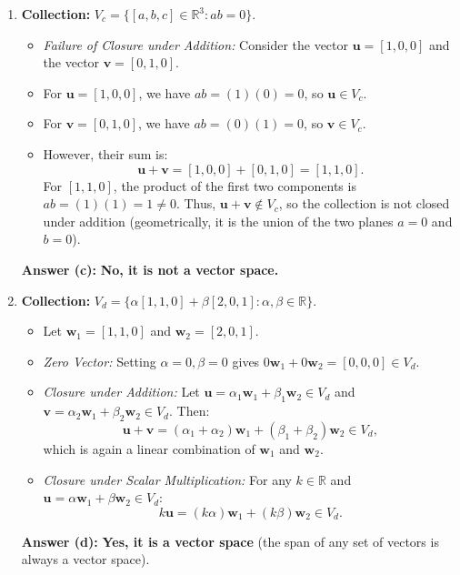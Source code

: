 \documentclass[11pt,a4paper]{article}
\begin{document}
\begin{enumerate}[label=(\alph*)]
    \item \textbf{Collection:} $V_c = \{[a, b, c] \in \mathbb{R}^3 : ab = 0\}$.
    \begin{itemize}
        \item \emph{Failure of Closure under Addition:} Consider the vector $\mathbf{u} = [1, 0, 0]$ and the vector $\mathbf{v} = [0, 1, 0]$.
        \item For $\mathbf{u} = [1, 0, 0]$, we have $a b = (1)(0) = 0$, so $\mathbf{u} \in V_c$.
        \item For $\mathbf{v} = [0, 1, 0]$, we have $a b = (0)(1) = 0$, so $\mathbf{v} \in V_c$.
        \item However, their sum is:
        \[
            \mathbf{u} + \mathbf{v} = [1, 0, 0] + [0, 1, 0] = [1, 1, 0].
        \]
        For $[1, 1, 0]$, the product of the first two components is $a b = (1)(1) = 1 \neq 0$. Thus, $\mathbf{u} + \mathbf{v} \notin V_c$, so the collection is not closed under addition (geometrically, it is the union of the two planes $a = 0$ and $b = 0$).
    \end{itemize}
    \textbf{Answer (c):} \textbf{No, it is not a vector space.}

    \item \textbf{Collection:} $V_d = \{\alpha[1, 1, 0] + \beta[2, 0, 1] : \alpha, \beta \in \mathbb{R}\}$.
    \begin{itemize}
        \item Let $\mathbf{w}_1 = [1, 1, 0]$ and $\mathbf{w}_2 = [2, 0, 1]$.
        \item \emph{Zero Vector:} Setting $\alpha = 0, \beta = 0$ gives $0\mathbf{w}_1 + 0\mathbf{w}_2 = [0, 0, 0] \in V_d$.
        \item \emph{Closure under Addition:} Let $\mathbf{u} = \alpha_1 \mathbf{w}_1 + \beta_1 \mathbf{w}_2 \in V_d$ and $\mathbf{v} = \alpha_2 \mathbf{w}_1 + \beta_2 \mathbf{w}_2 \in V_d$. Then:
        \[
            \mathbf{u} + \mathbf{v} = (\alpha_1 + \alpha_2)\mathbf{w}_1 + (\beta_1 + \beta_2)\mathbf{w}_2 \in V_d,
        \]
        which is again a linear combination of $\mathbf{w}_1$ and $\mathbf{w}_2$.
        \item \emph{Closure under Scalar Multiplication:} For any $k \in \mathbb{R}$ and $\mathbf{u} = \alpha \mathbf{w}_1 + \beta \mathbf{w}_2 \in V_d$:
        \[
            k\mathbf{u} = (k\alpha)\mathbf{w}_1 + (k\beta)\mathbf{w}_2 \in V_d.
        \]
    \end{itemize}
    \textbf{Answer (d):} \textbf{Yes, it is a vector space} (the span of any set of vectors is always a vector space).


\end{enumerate}
\end{document}
